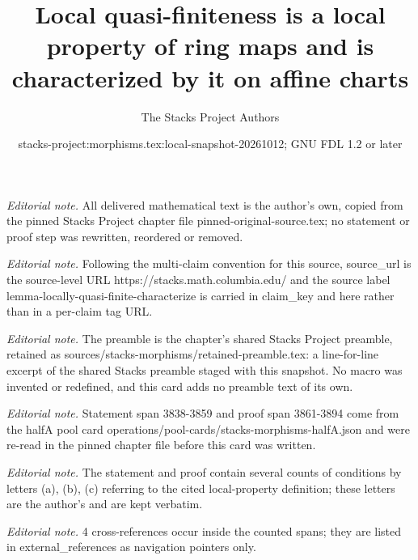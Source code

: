 \documentclass[10pt,a4paper]{amsart}
\title{Local quasi-finiteness is a local property of ring maps and is characterized by it on affine charts}
\author{The Stacks Project Authors}
\date{stacks-project:morphisms.tex:local-snapshot-20261012; GNU FDL 1.2 or later}
\theoremstyle{plain}
\theoremstyle{definition}
\theoremstyle{remark}
\numberwithin{equation}{subsection}
\begin{document}
\maketitle
\noindent\textit{Editorial note.} All delivered mathematical text is the author's own, copied from the pinned Stacks Project chapter file pinned-original-source.tex; no statement or proof step was rewritten, reordered or removed.\par\medskip
\noindent\textit{Editorial note.} Following the multi-claim convention for this source, source\_url is the source-level URL https://stacks.math.columbia.edu/ and the source label lemma-locally-quasi-finite-characterize is carried in claim\_key and here rather than in a per-claim tag URL.\par\medskip
\noindent\textit{Editorial note.} The preamble is the chapter's shared Stacks Project preamble, retained as sources/stacks-morphisms/retained-preamble.tex: a line-for-line excerpt of the shared Stacks preamble staged with this snapshot. No macro was invented or redefined, and this card adds no preamble text of its own.\par\medskip
\noindent\textit{Editorial note.} Statement span 3838-3859 and proof span 3861-3894 come from the halfA pool card operations/pool-cards/stacks-morphisms-halfA.json and were re-read in the pinned chapter file before this card was written.\par\medskip
\noindent\textit{Editorial note.} The statement and proof contain several counts of conditions by letters (a), (b), (c) referring to the cited local-property definition; these letters are the author's and are kept verbatim.\par\medskip
\noindent\textit{Editorial note.} 4 cross-references occur inside the counted spans; they are listed in external\_references as navigation pointers only.\par\medskip
\end{document}
